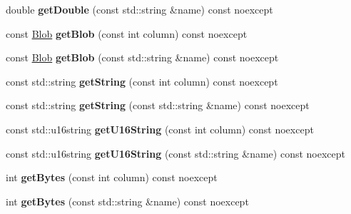 \begin{DoxyCompactItemize}
\item 
\hypertarget{class_s_q_lite_1_1_reader_a45e9dd813439e8cda7608e18c1ccce5f}{double {\bfseries get\-Double} (const std\-::string \&name) const noexcept}\label{class_s_q_lite_1_1_reader_a45e9dd813439e8cda7608e18c1ccce5f}

\item 
\hypertarget{class_s_q_lite_1_1_reader_a80028dc9f221648fe2398b40bd380c31}{const \hyperlink{class_s_q_lite_1_1_blob}{Blob} {\bfseries get\-Blob} (const int column) const noexcept}\label{class_s_q_lite_1_1_reader_a80028dc9f221648fe2398b40bd380c31}

\item 
\hypertarget{class_s_q_lite_1_1_reader_a4e50d9ec365c547b5edb7d062aeba72b}{const \hyperlink{class_s_q_lite_1_1_blob}{Blob} {\bfseries get\-Blob} (const std\-::string \&name) const noexcept}\label{class_s_q_lite_1_1_reader_a4e50d9ec365c547b5edb7d062aeba72b}

\item 
\hypertarget{class_s_q_lite_1_1_reader_a0920d021f6962f75e7b555e3f20fc0fc}{const std\-::string {\bfseries get\-String} (const int column) const noexcept}\label{class_s_q_lite_1_1_reader_a0920d021f6962f75e7b555e3f20fc0fc}

\item 
\hypertarget{class_s_q_lite_1_1_reader_a44f9f5da46aa91b869fe26a188e803fa}{const std\-::string {\bfseries get\-String} (const std\-::string \&name) const noexcept}\label{class_s_q_lite_1_1_reader_a44f9f5da46aa91b869fe26a188e803fa}

\item 
\hypertarget{class_s_q_lite_1_1_reader_a2b48f9e2ffbcfe787d85b4372a7ee29d}{const std\-::u16string {\bfseries get\-U16\-String} (const int column) const noexcept}\label{class_s_q_lite_1_1_reader_a2b48f9e2ffbcfe787d85b4372a7ee29d}

\item 
\hypertarget{class_s_q_lite_1_1_reader_ad6024ad6e74ee1ac47ad0ce79f905026}{const std\-::u16string {\bfseries get\-U16\-String} (const std\-::string \&name) const noexcept}\label{class_s_q_lite_1_1_reader_ad6024ad6e74ee1ac47ad0ce79f905026}

\item 
\hypertarget{class_s_q_lite_1_1_reader_aeb571e9157ef46c42ed48fc229b7842d}{int {\bfseries get\-Bytes} (const int column) const noexcept}\label{class_s_q_lite_1_1_reader_aeb571e9157ef46c42ed48fc229b7842d}

\item 
\hypertarget{class_s_q_lite_1_1_reader_ad183a562774f9590273bf35c6e232a1a}{int {\bfseries get\-Bytes} (const std\-::string \&name) const noexcept}\label{class_s_q_lite_1_1_reader_ad183a562774f9590273bf35c6e232a1a}


\end{DoxyCompactItemize}
